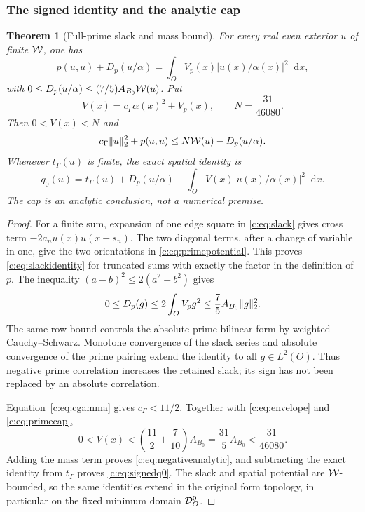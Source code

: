 \documentclass[11pt,a4paper]{article}
\numberwithin{equation}{section}
\newtheorem{theorem}{Theorem}[section]
\theoremstyle{definition}\newtheorem{definition}[theorem]{Definition}
\theoremstyle{remark}\newtheorem{remark}[theorem]{Remark}
\newcommand{\dd}{\mathop{}\!\mathrm d}\newcommand{\one}{\mathbf1}
\begin{document}
\subsubsection{The signed identity and the analytic cap}
\begin{theorem}[Full-prime slack and mass bound]\label{c:thm:signed}
For every real even exterior $u$ of finite $\mathcal W$, one has
\begin{equation}\label{c:eq:slackidentity}
 p(u,u)+D_p(u/\alpha)
 =\int_O V_p(x)|u(x)/\alpha(x)|^2\dd x,
\end{equation}
with $0\le D_p(u/\alpha)\le(7/5)A_{B_0}\mathcal W(u)$.
Put
\[
 V(x)=c_\Gamma\alpha(x)^2+V_p(x),\qquad N=\frac{31}{46080}.
\]
Then $0<V(x)<N$ and
\begin{equation}\label{c:eq:negativeanalytic}
 c_\Gamma\lVert u\rVert_2^2+p(u,u)
 \le N \mathcal W(u)-D_p(u/\alpha).
\end{equation}
Whenever $t_\Gamma(u)$ is finite, the exact spatial identity is
\begin{equation}\label{c:eq:signedq0}
 q_0(u)=t_\Gamma(u)+D_p(u/\alpha)
              -\int_OV(x)|u(x)/\alpha(x)|^2\dd x.
\end{equation}
The cap is an analytic conclusion, not a numerical premise.
\end{theorem}
\begin{proof}
For a finite sum, expansion of one edge square in \eqref{c:eq:slack}
gives cross term $-2a_nu(x)u(x+s_n)$. The two diagonal terms,
after a change of variable in one, give the two orientations in
\eqref{c:eq:primepotential}. This proves \eqref{c:eq:slackidentity} for
truncated sums with exactly the factor in the definition of $p$.
The inequality $(a-b)^2\le2(a^2+b^2)$ gives
\[
 0\le D_p(g)\le2\int_OV_pg^2\le\frac75 A_{B_0}\lVert g\rVert_2^2.
\]
The same row bound controls the absolute prime bilinear form by
weighted Cauchy--Schwarz. Monotone convergence of the slack series and
absolute convergence of the prime pairing extend the identity to all
$g\in L^2(O)$. Thus negative prime correlation increases the retained
slack; its sign has not been replaced by an absolute correlation.

Equation~\eqref{c:eq:cgamma} gives $c_\Gamma<11/2$. Together with
\eqref{c:eq:envelope} and \eqref{c:eq:primecap},
\[
 0<V(x)<\left(\frac{11}{2}+\frac7{10}\right)A_{B_0}
 =\frac{31}{5}A_{B_0}<\frac{31}{46080}.
\]
Adding the mass term proves \eqref{c:eq:negativeanalytic}, and
subtracting the exact identity from $t_\Gamma$ proves
\eqref{c:eq:signedq0}. The slack and spatial potential are $\mathcal W$-bounded,
so the same identities extend in the original form topology, in
particular on the fixed minimum domain $\mathcal D_O^0$.
\end{proof}
\end{document}
